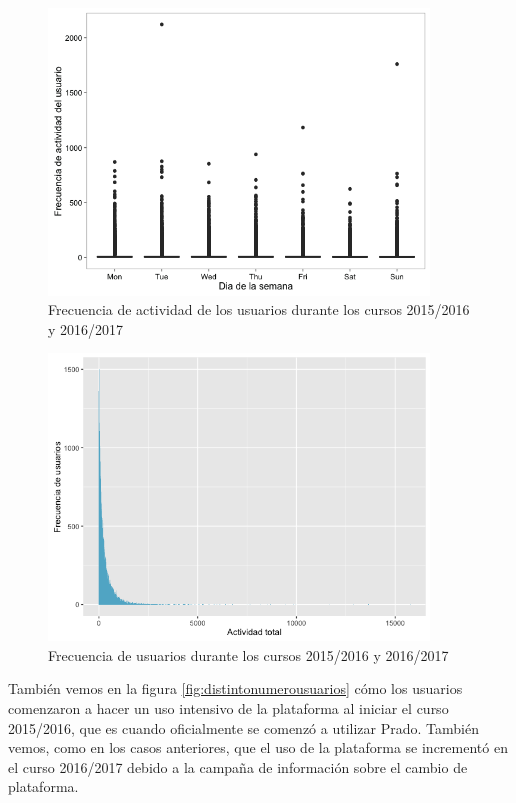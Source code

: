 \begin{figure}[H]
\centering
\includegraphics[width=0.9\textwidth]{../r/frecuenciaactividadusuario}
\caption{Frecuencia de actividad de los usuarios durante los cursos 2015/2016 y 2016/2017}
\label{fig:frecuenciaactividadusuario}
\end{figure}


\begin{figure}[H]
\centering
\includegraphics[width=0.9\textwidth]{../r/frecuenciausuarios}
\caption{Frecuencia de usuarios durante los cursos 2015/2016 y 2016/2017}
\label{fig:frecuenciausuarios}
\end{figure}


También vemos en la figura \ref{fig:distintonumerousuarios} cómo los usuarios comenzaron a hacer un uso intensivo de la plataforma al iniciar el curso 2015/2016, que es cuando oficialmente se comenzó a utilizar Prado. También vemos, como en los casos anteriores, que el uso de la plataforma se incrementó en el curso 2016/2017 debido a la campaña de información sobre el cambio de plataforma.



